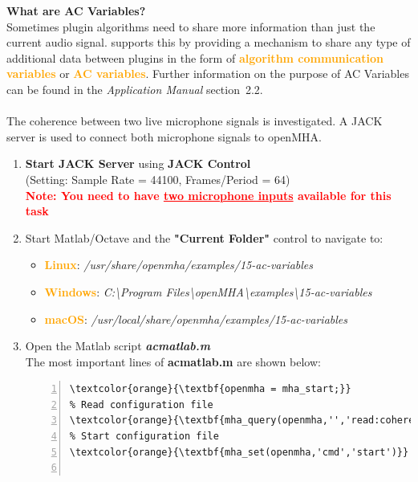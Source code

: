 \documentclass[11pt,a4paper,twoside]{article}
\newcommand{\+}{\discretionary{\mbox{\scriptsize$\hookleftarrow$}}{}{}}
\begin{document}
{{\textbf{What are AC Variables?} \\

Sometimes plugin algorithms need to share more information than just the current audio signal. \mha{} supports this by providing a mechanism to share any type of additional data between plugins in the form of \textcolor{orange}{\textbf{algorithm communication variables}} or \textcolor{orange}{\textbf{AC variables}}. Further information on the purpose of AC Variables can be found in the \textit{Application Manual} section~2.2. \\

\dotfill \\

The coherence between two live microphone signals is investigated. A JACK server is used to connect both microphone signals to openMHA.  

\begin{enumerate}

\item \textbf{Start JACK Server} using \textbf{JACK Control}\\
  (Setting: Sample Rate = 44100, Frames/Period = 64) \\
  \textcolor{red}{\textbf{Note: You need to have \underline{two microphone inputs} available for this task}}

\item Start Matlab/Octave and the \textbf{"Current Folder"} control to navigate to: 

\begin{itemize}
\item \textcolor{orange}{\textbf{Linux}}: \textit{/usr/share/openmha/examples/15-ac-variables} 
\item \textcolor{orange}{\textbf{Windows}}: \textit{C:\textbackslash Program Files\textbackslash openMHA\textbackslash examples\textbackslash 15-ac-variables}
\item \textcolor{orange}{\textbf{macOS}}: \textit{/usr/local/share/openmha/examples/15-ac-variables} 
\end{itemize}

\item Open the Matlab script \textbf{\textit{acmatlab.m}} \\

The most important lines of \textbf{acmatlab.m} are shown below:

\begin{Verbatim}[numbers=left,commandchars=\\\{\}]
%Start openMHA process
\textcolor{orange}{\textbf{openmha = mha_start;}}
% Read configuration file
\textcolor{orange}{\textbf{mha_query(openmha,'','read:coherence_live.cfg');}}
% Start configuration file
\textcolor{orange}{\textbf{mha_set(openmha,'cmd','start')}}


\end{Verbatim}
\end{enumerate}}}
\end{document}
